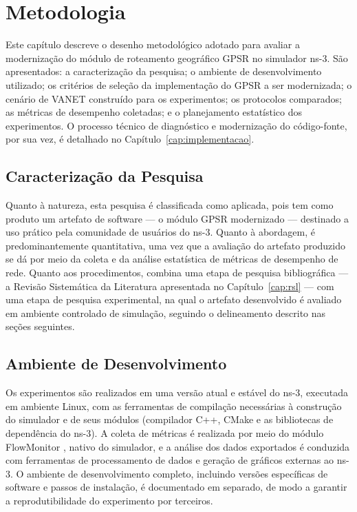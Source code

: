 \chapter{Metodologia}
\label{cap:metodologia}

Este capítulo descreve o desenho metodológico adotado para avaliar a modernização do módulo
de roteamento geográfico GPSR no simulador ns-3. São apresentados: a caracterização da
pesquisa; o ambiente de desenvolvimento utilizado; os critérios de seleção da implementação
do GPSR a ser modernizada; o cenário de VANET construído para os experimentos; os
protocolos comparados; as métricas de desempenho coletadas; e o planejamento estatístico dos
experimentos. O processo técnico de diagnóstico e modernização do código-fonte, por sua vez,
é detalhado no Capítulo~\ref{cap:implementacao}.

\section{Caracterização da Pesquisa}
\label{sec:caracterizacao}

Quanto à natureza, esta pesquisa é classificada como aplicada, pois tem como produto um
artefato de software — o módulo GPSR modernizado — destinado a uso prático pela comunidade
de usuários do ns-3. Quanto à abordagem, é predominantemente quantitativa, uma vez que a
avaliação do artefato produzido se dá por meio da coleta e da análise estatística de métricas
de desempenho de rede. Quanto aos procedimentos, combina uma etapa de pesquisa bibliográfica
— a Revisão Sistemática da Literatura apresentada no Capítulo~\ref{cap:rsl} — com uma etapa
de pesquisa experimental, na qual o artefato desenvolvido é avaliado em ambiente controlado
de simulação, seguindo o delineamento descrito nas seções seguintes.

\section{Ambiente de Desenvolvimento}
\label{sec:ambiente}

Os experimentos são realizados em uma versão atual e estável do ns-3, executada em ambiente
Linux, com as ferramentas de compilação necessárias à construção do simulador e de seus
módulos (compilador C++, CMake e as bibliotecas de dependência do ns-3). A coleta de
métricas é realizada por meio do módulo FlowMonitor \cite{carneiro2009flowmonitor}, nativo do
simulador, e a análise dos dados exportados é conduzida com ferramentas de processamento de
dados e geração de gráficos externas ao ns-3. O ambiente de desenvolvimento completo,
incluindo versões específicas de software e passos de instalação, é documentado em separado,
de modo a garantir a reprodutibilidade do experimento por terceiros.

